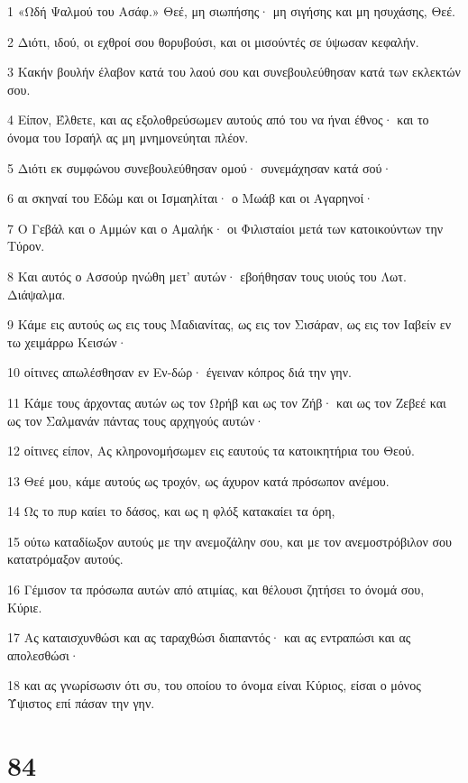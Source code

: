\par 1 «Ωδή Ψαλμού του Ασάφ.» Θεέ, μη σιωπήσης· μη σιγήσης και μη ησυχάσης, Θεέ.
\par 2 Διότι, ιδού, οι εχθροί σου θορυβούσι, και οι μισούντές σε ύψωσαν κεφαλήν.
\par 3 Κακήν βουλήν έλαβον κατά του λαού σου και συνεβουλεύθησαν κατά των εκλεκτών σου.
\par 4 Είπον, Έλθετε, και ας εξολοθρεύσωμεν αυτούς από του να ήναι έθνος· και το όνομα του Ισραήλ ας μη μνημονεύηται πλέον.
\par 5 Διότι εκ συμφώνου συνεβουλεύθησαν ομού· συνεμάχησαν κατά σού·
\par 6 αι σκηναί του Εδώμ και οι Ισμαηλίται· ο Μωάβ και οι Αγαρηνοί·
\par 7 Ο Γεβάλ και ο Αμμών και ο Αμαλήκ· οι Φιλισταίοι μετά των κατοικούντων την Τύρον.
\par 8 Και αυτός ο Ασσούρ ηνώθη μετ' αυτών· εβοήθησαν τους υιούς του Λωτ. Διάψαλμα.
\par 9 Κάμε εις αυτούς ως εις τους Μαδιανίτας, ως εις τον Σισάραν, ως εις τον Ιαβείν εν τω χειμάρρω Κεισών·
\par 10 οίτινες απωλέσθησαν εν Εν-δώρ· έγειναν κόπρος διά την γην.
\par 11 Κάμε τους άρχοντας αυτών ως τον Ωρήβ και ως τον Ζήβ· και ως τον Ζεβεέ και ως τον Σαλμανάν πάντας τους αρχηγούς αυτών·
\par 12 οίτινες είπον, Ας κληρονομήσωμεν εις εαυτούς τα κατοικητήρια του Θεού.
\par 13 Θεέ μου, κάμε αυτούς ως τροχόν, ως άχυρον κατά πρόσωπον ανέμου.
\par 14 Ως το πυρ καίει το δάσος, και ως η φλόξ κατακαίει τα όρη,
\par 15 ούτω καταδίωξον αυτούς με την ανεμοζάλην σου, και με τον ανεμοστρόβιλον σου κατατρόμαξον αυτούς.
\par 16 Γέμισον τα πρόσωπα αυτών από ατιμίας, και θέλουσι ζητήσει το όνομά σου, Κύριε.
\par 17 Ας καταισχυνθώσι και ας ταραχθώσι διαπαντός· και ας εντραπώσι και ας απολεσθώσι·
\par 18 και ας γνωρίσωσιν ότι συ, του οποίου το όνομα είναι Κύριος, είσαι ο μόνος Ύψιστος επί πάσαν την γην.

\chapter{84}


